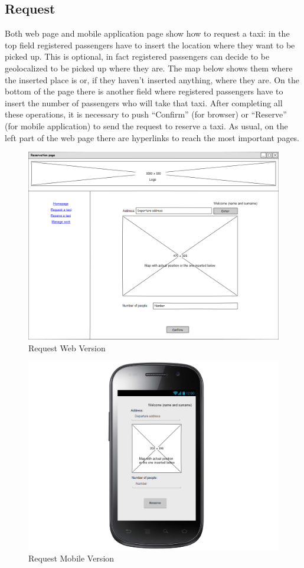 \subsection{Request}
Both web page and mobile application page show how to request a taxi: in the top field registered passengers have to insert the location where they want to be picked up. This is optional, in fact registered passengers can decide to be geolocalized to be picked up where they are. The map below shows them where the inserted place is or, if they haven't inserted anything, where they are. On the bottom of the page there is another field where registered passengers have to insert the number of passengers who will take that taxi. After completing all these operations, it is necessary to push ``Confirm'' (for browser) or ``Reserve'' (for mobile application) to send the request to reserve a taxi. \newline As usual, on the left part of the web page there are hyperlinks to reach the most important pages.
\begin{figure}[H]
\centering
\includegraphics[scale=0.35]{mockups/request_web.png}
\caption{Request Web Version}
\end{figure}
\begin{figure}[H]
\centering
\includegraphics[scale=0.35]{mockups/request_mobile.png}
\caption{Request Mobile Version}
\end{figure}
\break
